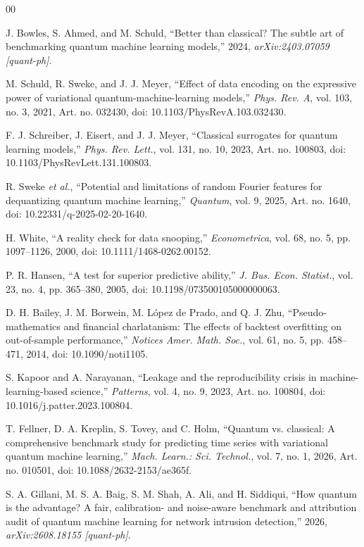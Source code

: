 \documentclass{ieeeaccess}
\begin{document}
\begin{thebibliography}{00}

J. Bowles, S. Ahmed, and M. Schuld, ``Better than classical? The subtle art of benchmarking quantum machine learning models,'' 2024, \emph{arXiv:2403.07059 [quant-ph]}.

M. Schuld, R. Sweke, and J. J. Meyer, ``Effect of data encoding on the expressive power of variational quantum-machine-learning models,'' \emph{Phys. Rev. A}, vol. 103, no. 3, 2021, Art. no. 032430, doi: 10.1103/PhysRevA.103.032430.

F. J. Schreiber, J. Eisert, and J. J. Meyer, ``Classical surrogates for quantum learning models,'' \emph{Phys. Rev. Lett.}, vol. 131, no. 10, 2023, Art. no. 100803, doi: 10.1103/PhysRevLett.131.100803.

R. Sweke \emph{et al.}, ``Potential and limitations of random Fourier features for dequantizing quantum machine learning,'' \emph{Quantum}, vol. 9, 2025, Art. no. 1640, doi: 10.22331/q-2025-02-20-1640.

H. White, ``A reality check for data snooping,'' \emph{Econometrica}, vol. 68, no. 5, pp. 1097--1126, 2000, doi: 10.1111/1468-0262.00152.

P. R. Hansen, ``A test for superior predictive ability,'' \emph{J. Bus. Econ. Statist.}, vol. 23, no. 4, pp. 365--380, 2005, doi: 10.1198/073500105000000063.

D. H. Bailey, J. M. Borwein, M. L\'opez de Prado, and Q. J. Zhu, ``Pseudo-mathematics and financial charlatanism: The effects of backtest overfitting on out-of-sample performance,'' \emph{Notices Amer. Math. Soc.}, vol. 61, no. 5, pp. 458--471, 2014, doi: 10.1090/noti1105.

S. Kapoor and A. Narayanan, ``Leakage and the reproducibility crisis in machine-learning-based science,'' \emph{Patterns}, vol. 4, no. 9, 2023, Art. no. 100804, doi: 10.1016/j.patter.2023.100804.

T. Fellner, D. A. Kreplin, S. Tovey, and C. Holm, ``Quantum vs. classical: A comprehensive benchmark study for predicting time series with variational quantum machine learning,'' \emph{Mach. Learn.: Sci. Technol.}, vol. 7, no. 1, 2026, Art. no. 010501, doi: 10.1088/2632-2153/ae365f.

S. A. Gillani, M. S. A. Baig, S. M. Shah, A. Ali, and H. Siddiqui, ``How quantum is the advantage? A fair, calibration- and noise-aware benchmark and attribution audit of quantum machine learning for network intrusion detection,'' 2026, \emph{arXiv:2608.18155 [quant-ph]}.


\end{thebibliography}
\end{document}

